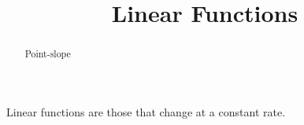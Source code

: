 \documentclass{ximera}
\title{Linear Functions}
\begin{document}
\begin{abstract}
Point-slope
\end{abstract}
\maketitle

Linear functions are those that change at a constant rate.
\end{document}

